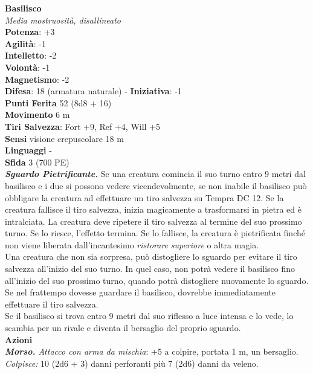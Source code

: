 \begin{multicols}{2}
\medskip\textbf{Basilisco}\\
\emph{Media mostruosità, disallineato}\\
\textbf{Potenza}: +3\\
\textbf{Agilità}: -1\\
\textbf{Intelletto}: -2\\
\textbf{Volontà}: -1\\
\textbf{Magnetismo}: -2\\
\textbf{Difesa}: 18 (armatura naturale) - \textbf{Iniziativa}: -1\\
\textbf{Punti Ferita} 52 (8d8 + 16)\\
\textbf{Movimento} 6 m\\
\textbf{Tiri Salvezza}: Fort +9, Ref +4, Will +5\\
\textbf{Sensi} visione crepuscolare 18 m\\
\textbf{Linguaggi} -\\
\textbf{Sfida} 3 (700 PE)\smallskip\\
\emph{\textbf{Sguardo Pietrificante.}} Se una creatura comincia il suo turno entro 9 metri dal basilisco e i due si possono vedere vicendevolmente, se non inabile il basilisco può obbligare la creatura ad effettuare un tiro salvezza su Tempra DC 12. Se la creatura fallisce il tiro  salvezza, inizia magicamente a trasformarsi in pietra ed è   intralciata. La creatura deve ripetere il tiro salvezza al termine del   suo prossimo turno. Se lo riesce, l'effetto termina. Se lo fallisce,   la creatura è pietrificata finché non viene liberata dall'incantesimo  \emph{ristorare} \emph{superiore} o altra magia. \\
Una creatura che non sia sorpresa, può distogliere lo sguardo per evitare il tiro salvezza all'inizio del suo turno. In quel caso, non potrà vedere il basilisco fino all'inizio del suo prossimo turno, quando potrà distogliere nuovamente lo sguardo. Se nel frattempo dovesse guardare il basilisco, dovrebbe immediatamente effettuare il tiro salvezza.\\
Se il basilisco si trova entro 9 metri dal suo riflesso a luce intensa e lo vede, lo scambia per un rivale e diventa il bersaglio del proprio sguardo.\\
\smallskip\textbf{Azioni}\\
\emph{\textbf{Morso.} Attacco con arma da mischia}: +5 a colpire, portata 1 m, un bersaglio. \\
\emph{Colpisce:} 10 (2d6 + 3) danni perforanti più 7 (2d6) danni da veleno.\\


\end{multicols}
